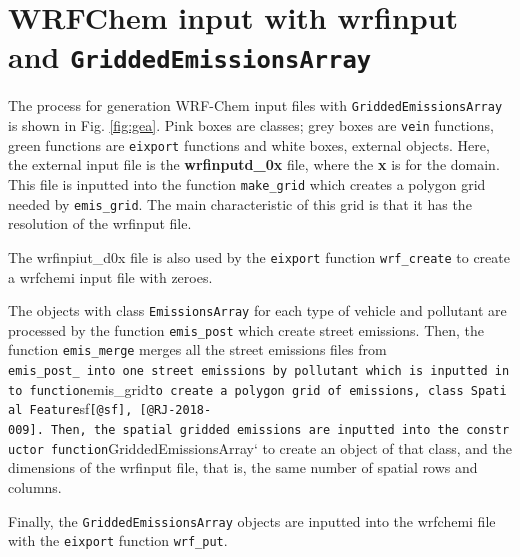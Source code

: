 \documentclass[12pt,graybox,envcountchap,sectrefs]{krantz}
\theoremstyle{definition}
\theoremstyle{definition}
\theoremstyle{definition}
\theoremstyle{remark}
\begin{document}
\section{\texorpdfstring{WRFChem input with wrfinput and
\texttt{GriddedEmissionsArray}}{WRFChem input with wrfinput and GriddedEmissionsArray}}\label{wrfchem-input-with-wrfinput-and-griddedemissionsarray}

The process for generation WRF-Chem input files with
\texttt{GriddedEmissionsArray} is shown in Fig. \ref{fig:gea}. Pink
boxes are classes; grey boxes are \texttt{vein} functions, green
functions are \texttt{eixport} functions and white boxes, external
objects. Here, the external input file is the \textbf{wrfinputd\_0x}
file, where the \textbf{x} is for the domain. This file is inputted into
the function \texttt{make\_grid} which creates a polygon grid needed by
\texttt{emis\_grid}. The main characteristic of this grid is that it has
the resolution of the wrfinput file.

The wrfinpiut\_d0x file is also used by the \texttt{eixport} function
\texttt{wrf\_create} to create a wrfchemi input file with zeroes.

The objects with class \texttt{EmissionsArray} for each type of vehicle
and pollutant are processed by the function \texttt{emis\_post} which
create street emissions. Then, the function \texttt{emis\_merge} merges
all the street emissions files from
\texttt{emis\_post\_\ into\ one\ street\ emissions\ by\ pollutant\ which\ is\ inputted\ into\ function}emis\_grid\texttt{to\ create\ a\ polygon\ grid\ of\ emissions,\ class\ Spatial\ Feature}sf\texttt{{[}@sf{]},\ {[}@RJ-2018-009{]}.\ Then,\ the\ spatial\ gridded\ emissions\ are\ inputted\ into\ the\ constructor\ function}GriddedEmissionsArray`
to create an object of that class, and the dimensions of the wrfinput
file, that is, the same number of spatial rows and columns.

Finally, the \texttt{GriddedEmissionsArray} objects are inputted into
the wrfchemi file with the \texttt{eixport} function \texttt{wrf\_put}.
\end{document}
